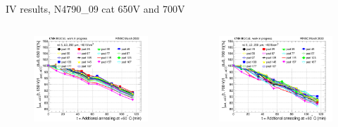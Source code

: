 \documentclass{beamer}
\begin{document}
\begin{frame}{IV results, N4790\_09 cat 650V and 700V}
  \begin{columns}
       \begin{figure}
           \includegraphics[width=1.0\textwidth]{plots/8in_198ch_2019_N4790_21_4E15_neg40degC_annealing_current_650.png}
       \end{figure}
       \begin{figure}
           \includegraphics[width=1.0\textwidth]{plots/8in_198ch_2019_N4790_21_4E15_neg40degC_annealing_current_700.png}
       \end{figure}
   \end{columns}
\end{frame}
\end{document}
